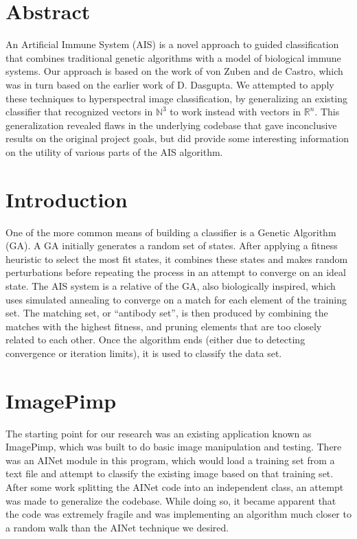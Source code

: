 \documentclass{article}
\title{\Title}
\author{\Author}
\date{\Date}
\theoremstyle{plain} %
\theoremstyle{remark}
\begin{document}
\maketitle
\section{Abstract}
An Artificial Immune System (AIS) is a novel approach to guided
classification that combines traditional genetic algorithms with a model
of biological immune systems. Our approach is based on the work of
von Zuben and de Castro\cite{decastro}, which was in turn based on the
earlier work of D. Dasgupta\cite{dasgupta}. We attempted to apply these
techniques to hyperspectral image classification, by generalizing an
existing classifier that recognized vectors in $\mathbb{N}^3$ to work
instead with vectors in $\mathbb{R}^n$. This generalization revealed
flaws in the underlying codebase that gave inconclusive results on the
original project goals, but did provide some interesting information on
the utility of various parts of the AIS algorithm.

\section{Introduction}
One of the more common means of building a classifier is a Genetic
Algorithm (GA). A GA initially generates a random set of states. After
applying a fitness heuristic to select the most fit states, it 
combines these states and makes random perturbations before repeating
the process in an attempt to converge on an ideal state\cite[126]{norvig}.
The AIS system is a relative of the GA, also biologically inspired,
which uses simulated annealing to converge on a match for each element
of the training set. The matching set, or ``antibody set'', is
then produced by combining the matches with the highest fitness, and
pruning elements that are too closely related to each other. Once
the algorithm ends (either due to detecting convergence or iteration
limits), it is used to classify the data set.

\section{ImagePimp}
The starting point for our research was an existing application known as
ImagePimp, which was built to do basic image manipulation and testing.
There was an AINet module in this program, which would load a training
set from a text file and attempt to classify the existing image based on
that training set. After some work splitting the AINet code into an
independent class, an attempt was made to generalize the codebase. While
doing so, it became apparent that the code was extremely fragile and was
implementing an algorithm much closer to a random walk than the AINet
technique we desired.
\end{document}
